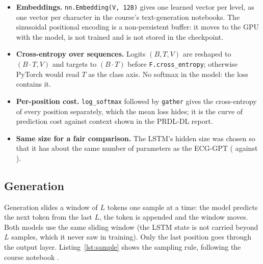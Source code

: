 

\begin{itemize}[leftmargin=1.2em,itemsep=1pt]
  \item \textbf{Embeddings.} \texttt{nn.Embedding(V, 128)} gives one learned vector per level, as one
        vector per character in the course's text-generation notebooks. The sinusoidal positional encoding
        is a non-persistent buffer: it moves to the GPU with the model, is not trained and is not stored in
        the checkpoint.
  \item \textbf{Cross-entropy over sequences.} Logits $(B, T, V)$ are reshaped to $(B\cdot T, V)$ and
        targets to $(B\cdot T)$ before \texttt{F.cross\_entropy}; otherwise PyTorch would read $T$ as the
        class axis. No softmax in the model: the loss contains it.
  \item \textbf{Per-position cost.} \texttt{log\_softmax} followed by \texttt{gather} gives the
        cross-entropy of every position separately, which the mean loss hides; it is the curve of
        prediction cost against context shown in the PRDL-DL report.
  \item \textbf{Same size for a fair comparison.} The LSTM's hidden size was chosen so that it has about
        the same number of parameters as the ECG-GPT (\generativeParamsLstm{} against
        \generativeParamsBase{}).
\end{itemize}

\subsection{Generation}

Generation slides a window of $L$ tokens one sample at a time: the model predicts the next token from
the last $L$, the token is appended and the window moves. Both models use the same sliding window (the
LSTM state is not carried beyond $L$ samples, which it never saw in training). Only the last position
goes through the output layer. Listing~\ref{lst:sample} shows the sampling rule, following the course
notebook \cite{course_nb_sampling}.



